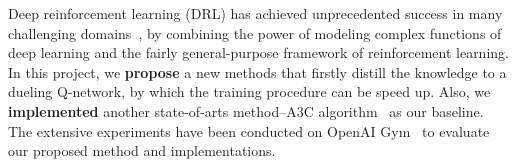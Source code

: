 Deep reinforcement learning (DRL) has achieved
unprecedented success in many challenging
domains~\cite{mnih2015human,silver2016mastering}, by combining the power of modeling complex
functions of deep learning and the fairly general-purpose framework of reinforcement learning.
In this project, we \textbf{propose} a new methods that firstly distill the knowledge to a dueling Q-network,
by which the training procedure can be speed up.
Also, we \textbf{implemented} another state-of-arts method--A3C algorithm~\cite{mnih2016asynchronous} as our
baseline.
The extensive experiments have been conducted on OpenAI Gym~\cite{brockman2016openai} to evaluate 
our proposed method and implementations.
